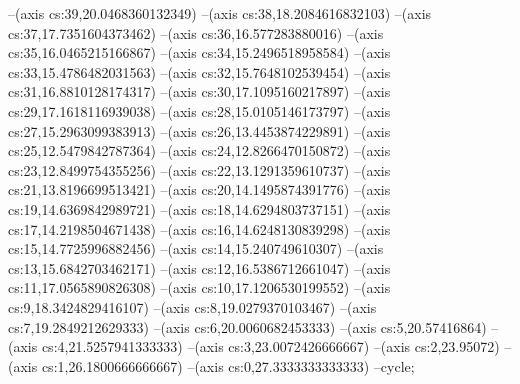 --(axis cs:39,20.0468360132349)
--(axis cs:38,18.2084616832103)
--(axis cs:37,17.7351604373462)
--(axis cs:36,16.577283880016)
--(axis cs:35,16.0465215166867)
--(axis cs:34,15.2496518958584)
--(axis cs:33,15.4786482031563)
--(axis cs:32,15.7648102539454)
--(axis cs:31,16.8810128174317)
--(axis cs:30,17.1095160217897)
--(axis cs:29,17.1618116939038)
--(axis cs:28,15.0105146173797)
--(axis cs:27,15.2963099383913)
--(axis cs:26,13.4453874229891)
--(axis cs:25,12.5479842787364)
--(axis cs:24,12.8266470150872)
--(axis cs:23,12.8499754355256)
--(axis cs:22,13.1291359610737)
--(axis cs:21,13.8196699513421)
--(axis cs:20,14.1495874391776)
--(axis cs:19,14.6369842989721)
--(axis cs:18,14.6294803737151)
--(axis cs:17,14.2198504671438)
--(axis cs:16,14.6248130839298)
--(axis cs:15,14.7725996882456)
--(axis cs:14,15.240749610307)
--(axis cs:13,15.6842703462171)
--(axis cs:12,16.5386712661047)
--(axis cs:11,17.0565890826308)
--(axis cs:10,17.1206530199552)
--(axis cs:9,18.3424829416107)
--(axis cs:8,19.0279370103467)
--(axis cs:7,19.2849212629333)
--(axis cs:6,20.0060682453333)
--(axis cs:5,20.57416864)
--(axis cs:4,21.5257941333333)
--(axis cs:3,23.0072426666667)
--(axis cs:2,23.95072)
--(axis cs:1,26.1800666666667)
--(axis cs:0,27.3333333333333)
--cycle;

